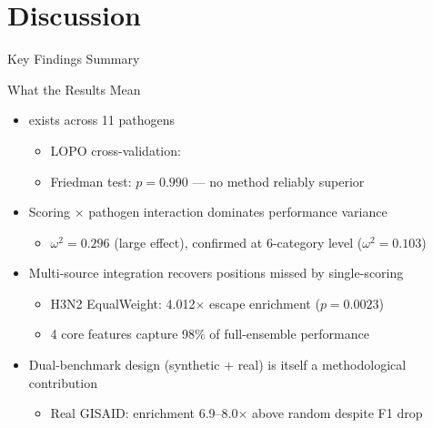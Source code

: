 \section{Discussion}

\begin{frame}{Key Findings Summary}
  \begin{block}{What the Results Mean}
    \begin{itemize}
      \item {} exists across 11 pathogens
        \begin{itemize}
          \item LOPO cross-validation: 
          \item Friedman test: $p = 0.990$ --- no method reliably superior
        \end{itemize}
      \item Scoring $\times$ pathogen interaction dominates performance variance
        \begin{itemize}
          \item $\omega^2 = 0.296$ (large effect), confirmed at 6-category level ($\omega^2 = 0.103$)
        \end{itemize}
      \item Multi-source integration recovers positions missed by single-scoring
        \begin{itemize}
          \item H3N2 EqualWeight: 4.012$\times$ escape enrichment ($p = 0.0023$)
          \item 4 core features capture 98\% of full-ensemble performance
        \end{itemize}
      \item Dual-benchmark design (synthetic + real) is itself a methodological contribution
        \begin{itemize}
          \item Real GISAID: enrichment 6.9--8.0$\times$ above random despite F1 drop
        \end{itemize}
    \end{itemize}
  \end{block}
\end{frame}

